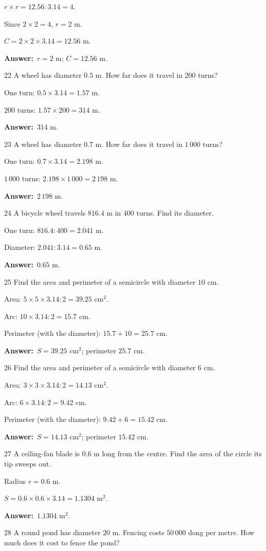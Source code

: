 \documentclass[11pt]{article}
\newif\ifsol \solfalse
\providecommand{\AnsWord}{Đáp số}
\newcommand{\dapso}[1]{\par\textbf{\AnsWord:}\ #1}
\newcommand{\probsol}[1]{%
  \begin{lrbox}{\solmeasure}\begin{minipage}{\dimexpr\linewidth-24pt\relax}#1\end{minipage}\end{lrbox}%
  \ifsol
    \begin{solbox}#1\end{solbox}%
  \else
    \setlength{\solht}{\dimexpr\ht\solmeasure+\dp\solmeasure+0.85cm\relax}%
    \ifdim\solht<1.35cm\setlength{\solht}{1.35cm}\fi
    \begin{tcolorbox}[colback=white,colframe=Line,boxrule=0.8pt,arc=5pt,
      left=8pt,right=8pt,top=4pt,bottom=4pt,height=\solht]{\footnotesize\color{Slate}\itshape\WorkWord}\end{tcolorbox}%
  \fi}
\newcommand{\gap}{\vspace{0.3cm}}
\def\WorkWord{Your work:}
\def\AnsWord{Answer}
\begin{document}
\probsol{
$r\times r=12.56:3.14=4$.\par Since $2\times2=4$, $r=2$ m.\par $C=2\times2\times3.14=12.56$ m.
\dapso{$r=2$ m; $C=12.56$ m.}}
\gap
\begin{probbox}{22}{\relax}
A wheel has diameter $0.5$ m. How far does it travel in $200$ turns?
\end{probbox}
\probsol{
One turn: $0.5\times3.14=1.57$ m.\par $200$ turns: $1.57\times200=314$ m.
\dapso{$314$ m.}}
\gap
\begin{probbox}{23}{\relax}
A wheel has diameter $0.7$ m. How far does it travel in $1\,000$ turns?
\end{probbox}
\probsol{
One turn: $0.7\times3.14=2.198$ m.\par $1\,000$ turns: $2.198\times1\,000=2\,198$ m.
\dapso{$2\,198$ m.}}
\gap
\begin{probbox}{24}{\relax}
A bicycle wheel travels $816.4$ m in $400$ turns. Find its diameter.
\end{probbox}
\probsol{
One turn: $816.4:400=2.041$ m.\par Diameter: $2.041:3.14=0.65$ m.
\dapso{$0.65$ m.}}
\gap
\begin{probbox}{25}{\relax}
Find the area and perimeter of a semicircle with diameter $10$ cm.
\end{probbox}
\probsol{
Area: $5\times5\times3.14:2=39.25$ cm$^2$.\par Arc: $10\times3.14:2=15.7$ cm.\par Perimeter (with the diameter): $15.7+10=25.7$ cm.
\dapso{$S=39.25$ cm$^2$; perimeter $25.7$ cm.}}
\gap
\begin{probbox}{26}{\relax}
Find the area and perimeter of a semicircle with diameter $6$ cm.
\end{probbox}
\probsol{
Area: $3\times3\times3.14:2=14.13$ cm$^2$.\par Arc: $6\times3.14:2=9.42$ cm.\par Perimeter (with the diameter): $9.42+6=15.42$ cm.
\dapso{$S=14.13$ cm$^2$; perimeter $15.42$ cm.}}
\gap
\begin{probbox}{27}{\relax}
A ceiling-fan blade is $0.6$ m long from the centre. Find the area of the circle its tip sweeps out.
\end{probbox}
\probsol{
Radius $r=0.6$ m.\par $S=0.6\times0.6\times3.14=1.1304$ m$^2$.
\dapso{$1.1304$ m$^2$.}}
\gap
\begin{probbox}{28}{\relax}
A round pond has diameter $20$ m. Fencing costs $50\,000$ dong per metre. How much does it cost to fence the pond?
\end{probbox}
\end{document}
